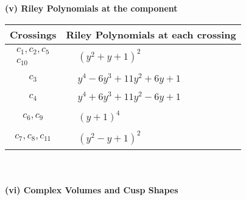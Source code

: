 \documentclass[1p]{elsarticle_modified}
\theoremstyle{definition}
\begin{document}
\newpage\renewcommand{\arraystretch}{1}
\flushleft \textbf{(v) Riley Polynomials at the component}\newline \\
\begin{tabular}{m{50pt}|m{274pt}}
Crossings & \hspace{64pt}Riley Polynomials at each crossing \\
\hline $$\begin{aligned}c_{1},c_{2},c_{5}\\c_{10}\end{aligned}$$&$\begin{aligned}
&(y^2+y+1)^2
\end{aligned}$\\
\hline $$\begin{aligned}c_{3}\end{aligned}$$&$\begin{aligned}
&y^4-6 y^3+11 y^2+6 y+1
\end{aligned}$\\
\hline $$\begin{aligned}c_{4}\end{aligned}$$&$\begin{aligned}
&y^4+6 y^3+11 y^2-6 y+1
\end{aligned}$\\
\hline $$\begin{aligned}c_{6},c_{9}\end{aligned}$$&$\begin{aligned}
&(y+1)^4
\end{aligned}$\\
\hline $$\begin{aligned}c_{7},c_{8},c_{11}\end{aligned}$$&$\begin{aligned}
&(y^2- y+1)^2
\end{aligned}$\\
\hline
\end{tabular}\\~\\
\newpage\flushleft \textbf{(vi) Complex Volumes and Cusp Shapes}
\end{document}
